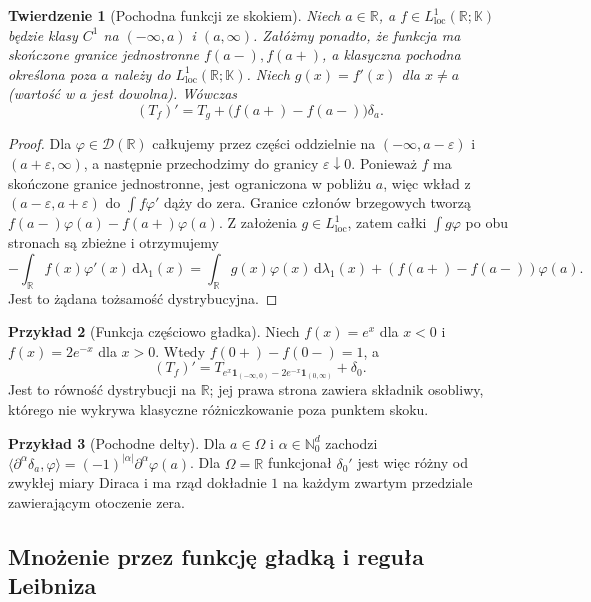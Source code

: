 \documentclass[11pt,a4paper]{article}
\numberwithin{equation}{section}
\theoremstyle{plain}
\newtheorem{twierdzenie}{Twierdzenie}[section]
\theoremstyle{definition}
\newtheorem{przyklad}[twierdzenie]{Przykład}
\theoremstyle{remark}
\newcommand{\R}{\mathbb R}
\newcommand{\N}{\mathbb N}
\newcommand{\K}{\mathbb K}
\begin{document}
\begin{twierdzenie}[Pochodna funkcji ze skokiem]
\label{thm:jump20}
Niech $a\in\R$, a $f\in L^1_{\mathrm{loc}}(\R;\K)$ będzie
klasy $C^1$ na $(-\infty,a)$ i $(a,\infty)$. Załóżmy ponadto,
że funkcja ma skończone granice jednostronne
$f(a-),f(a+)$, a klasyczna pochodna określona poza $a$
należy do $L^1_{\mathrm{loc}}(\R;\K)$.
Niech $g(x)=f'(x)$ dla $x\ne a$ (wartość w $a$ jest dowolna).
Wówczas
\[
 (T_f)'=T_g+\bigl(f(a+)-f(a-)\bigr)\delta_a.
\]
\end{twierdzenie}
\begin{proof}
Dla $\varphi\in\mathcal D(\R)$ całkujemy przez części
oddzielnie na $(-\infty,a-\varepsilon)$ i
$(a+\varepsilon,\infty)$, a następnie przechodzimy do
granicy $\varepsilon\downarrow0$. Ponieważ $f$ ma skończone
granice jednostronne, jest ograniczona w pobliżu $a$,
więc wkład z $(a-\varepsilon,a+\varepsilon)$ do
$\int f\varphi'$ dąży do zera. Granice członów brzegowych
tworzą $f(a-)\varphi(a)-f(a+)\varphi(a)$.
Z założenia $g\in L^1_{\mathrm{loc}}$, zatem całki
$\int g\varphi$ po obu stronach są zbieżne i otrzymujemy
\[
 -\int_\R f(x)\varphi'(x)\,\mathrm d\lambda_1(x)
 =\int_\R g(x)\varphi(x)\,\mathrm d\lambda_1(x)
 +(f(a+)-f(a-))\varphi(a).
\]
Jest to żądana tożsamość dystrybucyjna.
\end{proof}

\begin{przyklad}[Funkcja częściowo gładka]
\label{ex:piecewise20}
Niech $f(x)=e^x$ dla $x<0$ i $f(x)=2e^{-x}$ dla $x>0$.
Wtedy $f(0+)-f(0-)=1$, a
\[
 (T_f)'=T_{e^x\mathbf1_{(-\infty,0)}
 -2e^{-x}\mathbf1_{(0,\infty)}}+\delta_0.
\]
Jest to równość dystrybucji na $\R$; jej prawa strona
zawiera składnik osobliwy, którego nie wykrywa klasyczne
różniczkowanie poza punktem skoku.
\end{przyklad}

\begin{przyklad}[Pochodne delty]
\label{ex:delta-derivative20}
Dla $a\in\Omega$ i $\alpha\in\N_0^d$ zachodzi
$\langle\partial^\alpha\delta_a,\varphi\rangle
=(-1)^{|\alpha|}\partial^\alpha\varphi(a)$.
Dla $\Omega=\R$ funkcjonał $\delta_0'$ jest więc różny
od zwykłej miary Diraca i ma rząd dokładnie $1$ na każdym
zwartym przedziale zawierającym otoczenie zera.
\end{przyklad}

\subsection{Mnożenie przez funkcję gładką i reguła Leibniza}
\end{document}
